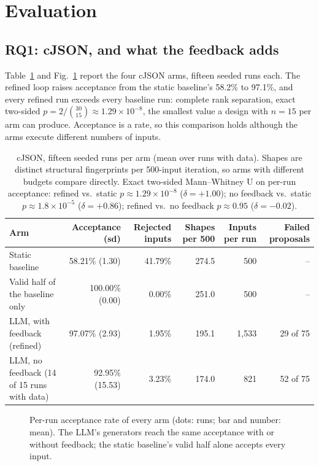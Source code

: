 \section{Evaluation}
\label{sec:evaluation}

\subsection{RQ1: cJSON, and what the feedback adds}

Table~\ref{tab:cjson-comparison} and Fig.~\ref{fig:acceptance-strip} report
the four cJSON arms, fifteen seeded runs each. The refined loop raises
acceptance from the static baseline's 58.2\% to 97.1\%, and every refined
run exceeds every baseline run: complete rank separation, exact two-sided
$p = 2/\binom{30}{15} \approx 1.29\times10^{-8}$, the smallest value a
design with $n{=}15$ per arm can produce. Acceptance is a rate, so this
comparison holds although the arms execute different numbers of inputs.

\begin{table}[t]
\centering
\caption{cJSON, fifteen seeded runs per arm (mean over runs with data).
Shapes are distinct structural fingerprints per 500-input iteration, so
arms with different budgets compare directly. Exact two-sided Mann--Whitney
U on per-run acceptance: refined vs.\ static $p \approx 1.29\times10^{-8}$
($\delta = +1.00$); no feedback vs.\ static $p \approx 1.8\times10^{-5}$
($\delta = +0.86$); refined vs.\ no feedback $p \approx 0.95$
($\delta = -0.02$).}
\label{tab:cjson-comparison}
\begin{tabular}{lrrrrr}
\toprule
Arm & Acceptance (sd) & Rejected inputs & Shapes per 500 & Inputs per run & Failed proposals \\
\midrule
Static baseline & 58.21\% (1.30) & 41.79\% & 274.5 & 500 & -- \\
Valid half of the baseline only & 100.00\% (0.00) & 0.00\% & 251.0 & 500 & -- \\
LLM, with feedback (refined) & 97.07\% (2.93) & 1.95\% & 195.1 & 1{,}533 & 29 of 75 \\
LLM, no feedback (14 of 15 runs with data) & 92.95\% (15.53) & 3.23\% & 174.0 & 821 & 52 of 75 \\
\bottomrule
\end{tabular}
\end{table}

\begin{figure}[t]
\centering

\caption{Per-run acceptance rate of every arm (dots: runs; bar and number:
mean). The LLM's generators reach the same acceptance with or without
feedback; the static baseline's valid half alone accepts every input.}
\label{fig:acceptance-strip}
\end{figure}

